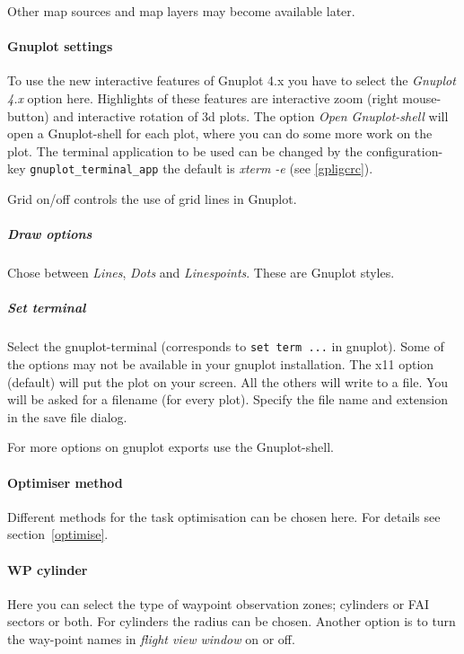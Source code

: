 Other map sources and map layers may become available later.




\paragraph{Gnuplot settings}
To use the new interactive features of Gnuplot 4.x you have to select the \emph{Gnuplot 4.x} option here. Highlights of these features are interactive zoom (right mouse-button) and interactive rotation of 3d plots.
The option \emph{Open Gnuplot-shell} will open a Gnuplot-shell for each plot, where you can do some more work on the plot. The  terminal application to be used can be changed by the configuration-key \texttt{gnuplot\_terminal\_app} the default is \emph{xterm -e} (see \ref{gpligcrc}).

Grid on/off controls the use of grid lines in Gnuplot.

\subparagraph{Draw options}
Chose between \emph{Lines}, \emph{Dots} and \emph{Linespoints}. These are Gnuplot styles.


\subparagraph{Set terminal}
Select the gnuplot-terminal (corresponds to \texttt{set term ...} in gnuplot).
Some of the options may not be available in your gnuplot installation.
The x11 option (default) will put the plot on your screen.
All the others will write to a file. You will be asked for a filename (for
every plot). Specify the file name and extension in the save file dialog.

For more options on gnuplot exports use the Gnuplot-shell.


\paragraph{Optimiser method}
Different methods for the task optimisation can be chosen here. For details see section~\ref{optimise}.

\paragraph{WP cylinder}
Here you can select the type of waypoint observation zones; cylinders or FAI
sectors or both. For cylinders the radius can be chosen. Another option is to
turn the way-point names in \emph{flight view window} on or off.


